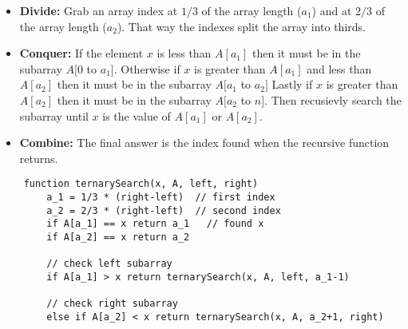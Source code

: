 \documentclass{article}
\begin{document}
\begin{enumerate}
            \begin{itemize}
                \item \textbf{Divide:} Grab an array index at $1/3$ of the array length ($a_1$) and at $2/3$ of the array length ($a_2$). That way the indexes split the array into thirds.
                \item \textbf{Conquer:} If the element $x$ is less than $A[a_1]$ then it must be in the subarray $A[0$ to $a_1]$. Otherwise if $x$ is greater than $A[a_1]$ and less than $A[a_2]$ then it must be in the subarray $A[a_1$ to $a_2]$ Lastly if $x$ is greater than $A[a_2]$ then it must be in the subarray $A[a_2$ to $n]$. Then recusievly search the subarray until $x$ is the value of $A[a_1]$ or $A[a_2]$.
                \item \textbf{Combine:} The final answer is the index found when the recursive function returns.
            \end{itemize}
            \begin{lstlisting}
    function ternarySearch(x, A, left, right) 
        a_1 = 1/3 * (right-left)  // first index
        a_2 = 2/3 * (right-left)  // second index
        if A[a_1] == x return a_1   // found x
        if A[a_2] == x return a_2

        // check left subarray
        if A[a_1] > x return ternarySearch(x, A, left, a_1-1)

        // check right subarray
        else if A[a_2] < x return ternarySearch(x, A, a_2+1, right)
        

\end{lstlisting}
\end{enumerate}
\end{document}
